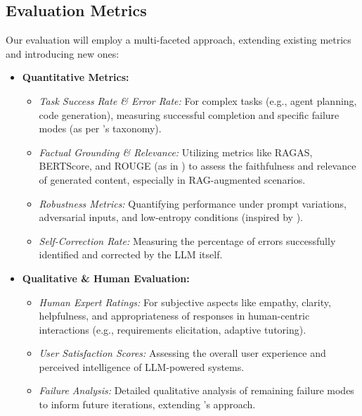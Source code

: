 \documentclass{article}
\newcommand{\citePone}{\cite{paper1}}
\newcommand{\citePthree}{\cite{paper3}}
\newcommand{\citePfive}{\cite{paper5}}
\begin{document}
\subsection{Evaluation Metrics}
Our evaluation will employ a multi-faceted approach, extending existing metrics and introducing new ones:
\begin{itemize}[noitemsep]
    \item \textbf{Quantitative Metrics:}
    \begin{itemize}[noitemsep]
        \item \textit{Task Success Rate \& Error Rate:} For complex tasks (e.g., agent planning, code generation), measuring successful completion and specific failure modes (as per \citePone{}'s taxonomy).
        \item \textit{Factual Grounding \& Relevance:} Utilizing metrics like RAGAS, BERTScore, and ROUGE (as in \citePfive{}) to assess the faithfulness and relevance of generated content, especially in RAG-augmented scenarios.
        \item \textit{Robustness Metrics:} Quantifying performance under prompt variations, adversarial inputs, and low-entropy conditions (inspired by \citePthree{}).
        \item \textit{Self-Correction Rate:} Measuring the percentage of errors successfully identified and corrected by the LLM itself.
    \end{itemize}
    \item \textbf{Qualitative \& Human Evaluation:}
    \begin{itemize}[noitemsep]
        \item \textit{Human Expert Ratings:} For subjective aspects like empathy, clarity, helpfulness, and appropriateness of responses in human-centric interactions (e.g., requirements elicitation, adaptive tutoring).
        \item \textit{User Satisfaction Scores:} Assessing the overall user experience and perceived intelligence of LLM-powered systems.
        \item \textit{Failure Analysis:} Detailed qualitative analysis of remaining failure modes to inform future iterations, extending \citePone{}'s approach.
    \end{itemize}
\end{itemize}
\end{document}
